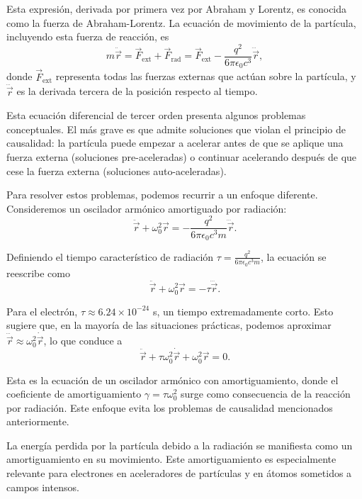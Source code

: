 \documentclass[12pt,a4paper]{book}
\begin{document}
Esta expresión, derivada por primera vez por Abraham y Lorentz, es conocida como la fuerza de Abraham-Lorentz. La ecuación de movimiento de la partícula, incluyendo esta fuerza de reacción, es
\begin{equation}
m\ddot{\vec{r}} = \vec{F}_{\text{ext}} + \vec{F}_{\text{rad}} = \vec{F}_{\text{ext}} - \frac{q^2}{6\pi\epsilon_0c^3}\dddot{\vec{r}},
\end{equation}
donde $\vec{F}_{\text{ext}}$ representa todas las fuerzas externas que actúan sobre la partícula, y $\dddot{\vec{r}}$ es la derivada tercera de la posición respecto al tiempo.

Esta ecuación diferencial de tercer orden presenta algunos problemas conceptuales. El más grave es que admite soluciones que violan el principio de causalidad: la partícula puede empezar a acelerar antes de que se aplique una fuerza externa (soluciones pre-aceleradas) o continuar acelerando después de que cese la fuerza externa (soluciones auto-aceleradas).

Para resolver estos problemas, podemos recurrir a un enfoque diferente. Consideremos un oscilador armónico amortiguado por radiación:
\begin{equation}
\ddot{\vec{r}} + \omega_0^2\vec{r} = -\frac{q^2}{6\pi\epsilon_0c^3m}\dddot{\vec{r}}.
\end{equation}

Definiendo el tiempo característico de radiación $\tau = \frac{q^2}{6\pi\epsilon_0c^3m}$, la ecuación se reescribe como
\begin{equation}
\ddot{\vec{r}} + \omega_0^2\vec{r} = -\tau\dddot{\vec{r}}.
\end{equation}

Para el electrón, $\tau \approx 6.24 \times 10^{-24}$ s, un tiempo extremadamente corto. Esto sugiere que, en la mayoría de las situaciones prácticas, podemos aproximar $\dddot{\vec{r}} \approx \omega_0^2\dot{\vec{r}}$, lo que conduce a
\begin{equation}
\ddot{\vec{r}} + \tau\omega_0^2\dot{\vec{r}} + \omega_0^2\vec{r} = 0.
\end{equation}

Esta es la ecuación de un oscilador armónico con amortiguamiento, donde el coeficiente de amortiguamiento $\gamma = \tau\omega_0^2$ surge como consecuencia de la reacción por radiación. Este enfoque evita los problemas de causalidad mencionados anteriormente.

La energía perdida por la partícula debido a la radiación se manifiesta como un amortiguamiento en su movimiento. Este amortiguamiento es especialmente relevante para electrones en aceleradores de partículas y en átomos sometidos a campos intensos.
\end{document}
